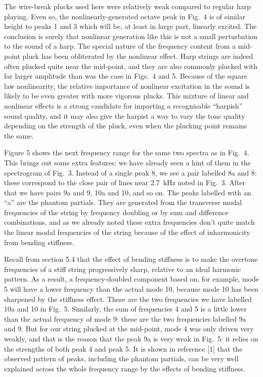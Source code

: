   The wire-break plucks used here were relatively weak compared to regular harp 
  playing. Even so, the nonlinearly-generated octave peak in Fig.\ 4 is of 
  similar height to peaks 1 and 3 which will be, at least in large part, 
  linearly excited. The conclusion is surely that nonlinear generation like 
  this is not a small perturbation to the sound of a harp. The special nature 
  of the frequency content from a mid-point pluck has been obliterated by the 
  nonlinear effect. Harp strings are indeed often plucked quite near the 
  mid-point, and they are also commonly plucked with far larger amplitude than 
  was the case in Figs.\ 4 and 5. Because of the square law nonlinearity, the 
  relative importance of nonlinear excitation in the sound is likely to be even 
  greater with more vigorous plucks. This mixture of linear and nonlinear 
  effects is a strong candidate for imparting a recognisable “harpish” sound 
  quality, and it may also give the harpist a way to vary the tone quality 
  depending on the strength of the pluck, even when the plucking point remains 
  the same. 

  Figure 5 shows the next frequency range for the same two spectra as in Fig.\ 
  4. This brings out some extra features: we have already seen a hint of them 
  in the spectrogram of Fig.\ 3. Instead of a single peak 8, we see a pair 
  labelled 8a and 8: these correspond to the close pair of lines near 2.7~kHz 
  noted in Fig.\ 3. After that we have pairs 9a and 9, 10a and 10, and so on. 
  The peaks labelled with an ``a'' are the phantom partials. They are generated 
  from the transverse modal frequencies of the string by frequency doubling or 
  by sum and difference combinations, and as we already noted these extra 
  frequencies don't quite match the linear modal frequencies of the string 
  because of the effect of inharmonicity from bending stiffness. 

  Recall from section 5.4 that the effect of bending stiffness is to make the 
  overtone frequencies of a stiff string progressively sharp, relative to an 
  ideal harmonic pattern. As a result, a frequency-doubled component based on, 
  for example, mode 5 will have a lower frequency than the actual mode 10, 
  because mode 10 has been sharpened by the stiffness effect. These are the two 
  frequencies we have labelled 10a and 10 in Fig.\ 5. Similarly, the sum of 
  frequencies 4 and 5 is a little lower than the actual frequency of mode 9: 
  these are the two frequencies labelled 9a and 9. But for our string plucked 
  at the mid-point, mode 4 was only driven very weakly, and that is the reason 
  that the peak 9a is very weak in Fig.\ 5: it relies on the strengths of both 
  peak 4 and peak 5. It is shown in reference [1] that the observed pattern of 
  peaks, including the phantom partials, can be very well explained across the 
  whole frequency range by the effects of bending stiffness. 

